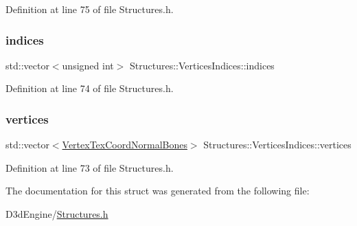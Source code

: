 Definition at line 75 of file Structures.\+h.

\mbox{\label{struct_structures_1_1_vertices_indices_a7763f6218cd1e0dda0c0e52444a62b37}} 
\subsubsection{\texorpdfstring{indices}{indices}}
{\footnotesize\ttfamily std\+::vector$<$unsigned int$>$ Structures\+::\+Vertices\+Indices\+::indices}



Definition at line 74 of file Structures.\+h.

\mbox{\label{struct_structures_1_1_vertices_indices_a17a49029b0b00cbf9a0670033b338e10}} 
\subsubsection{\texorpdfstring{vertices}{vertices}}
{\footnotesize\ttfamily std\+::vector$<$\mbox{\hyperlink{struct_structures_1_1_vertex_tex_coord_normal_bones}{Vertex\+Tex\+Coord\+Normal\+Bones}}$>$ Structures\+::\+Vertices\+Indices\+::vertices}



Definition at line 73 of file Structures.\+h.



The documentation for this struct was generated from the following file\+:\begin{DoxyCompactItemize}
\item 
D3d\+Engine/\mbox{\hyperlink{_structures_8h}{Structures.\+h}}\end{DoxyCompactItemize}
